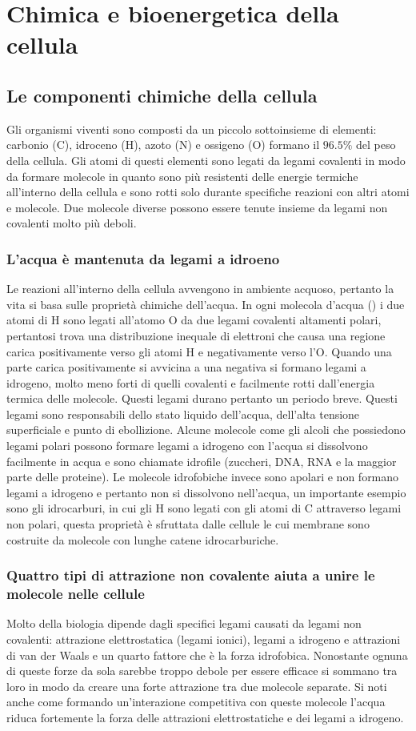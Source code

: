 \chapter{Chimica e bioenergetica della cellula}
\section{Le componenti chimiche della cellula}
Gli organismi viventi sono composti da un piccolo sottoinsieme di elementi: carbonio (C), idroceno (H), azoto (N) e ossigeno (O) formano il $96.5\%$ del peso della cellula. Gli atomi di
questi elementi sono legati da legami covalenti in modo da formare molecole in quanto sono pi\`u resistenti delle energie termiche all'interno della cellula e sono rotti solo durante
specifiche reazioni con altri atomi e molecole. Due molecole diverse possono essere tenute insieme da legami non covalenti molto pi\`u deboli.
\subsection{L'acqua \`e mantenuta da legami a idroeno}
Le reazioni all'interno della cellula avvengono in ambiente acquoso, pertanto la vita si basa sulle propriet\`a chimiche dell'acqua. In ogni molecola d'acqua () i due atomi di 
H sono legati all'atomo O da due legami covalenti altamenti polari, pertantosi trova una distribuzione inequale di elettroni che causa una regione carica positivamente verso gli atomi H
e negativamente verso l'O. Quando una parte carica positivamente si avvicina a una negativa si formano legami a idrogeno, molto meno forti di quelli covalenti e facilmente rotti 
dall'energia termica delle molecole. Questi legami durano pertanto un periodo breve. Questi legami sono responsabili dello stato liquido dell'acqua, dell'alta tensione superficiale e 
punto di ebollizione. Alcune molecole come gli alcoli che possiedono legami polari possono formare legami a idrogeno con l'acqua si dissolvono facilmente in acqua e sono chiamate 
idrofile (zuccheri, DNA, RNA e la maggior parte delle proteine). Le molecole idrofobiche invece sono apolari e non formano legami a idrogeno e pertanto non si dissolvono nell'acqua, un
importante esempio sono gli idrocarburi, in cui gli H sono legati con gli atomi di C attraverso legami non polari, questa propriet\`a \`e sfruttata dalle cellule le cui membrane sono 
costruite da molecole con lunghe catene idrocarburiche.
\subsection{Quattro tipi di attrazione non covalente aiuta a unire le molecole nelle cellule}
Molto della biologia dipende dagli specifici legami causati da legami non covalenti: attrazione elettrostatica (legami ionici), legami a idrogeno e attrazioni di van der Waals e un 
quarto fattore che \`e la forza idrofobica. Nonostante ognuna di queste forze da sola sarebbe troppo debole per essere efficace si sommano tra loro in modo da creare una forte attrazione
tra due molecole separate. Si noti anche come formando un'interazione competitiva con queste molecole l'acqua riduca fortemente la forza delle attrazioni elettrostatiche e dei legami a 
idrogeno.
